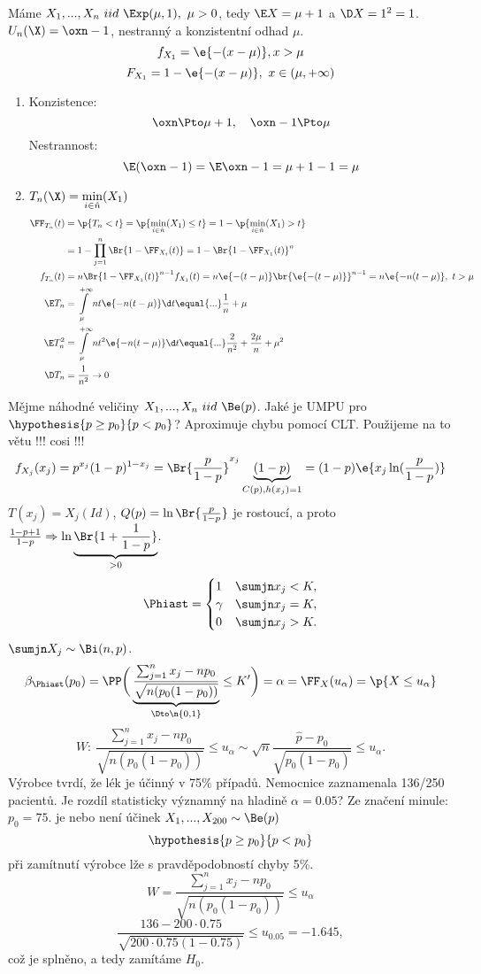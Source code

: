 \begin{example}
	Máme $X_1,...,X_n~iid~\Exp(\mu,1),~\mu>0$, tedy $\E X=\mu+1$ a $\D X=1^2=1$. $U_n(\X)=\oxn-1$, nestranný a konzistentní odhad $\mu$.
	$$ f_{X_1}=\e{-(x-\mu)},x>\mu $$
	$$ F_{X_1} = 1 - \e{-(x - \mu)},~ x \in (\mu,+\infty)$$
	\begin{enumerate}
	\item Konzistence: $$\oxn\Pto \mu+1,~~~\oxn-1\Pto\mu$$ 
	Nestrannost:
	$$\E(\oxn-1)=\E\oxn-1=\mu+1-1=\mu$$
	\item $ T_n(\X)=\min\limits_{i\in\hat{n}}(X_1) $
	\[
	\begin{split}
 	\FF_{T_n}(t)&=\p{T_n<t}=\p{\min\limits_{i\in\hat{n}}(X_1)\leq t}=1-\p{\min\limits_{i\in\hat{n}}(X_1)>t}\\ &=1-\prod\limits_{j=1}^n\Br{1-\FF_{X_i}(t)}=1-\Br{1-\FF_{X_1}(t)}^n\\
	f_{T_n}(t)&=n\Br{1-\FF_{X_1}(t)}^{n-1}f_{X_1}(t)=n\e{-(t-\mu)}\br{\e{-(t-\mu)}}^{n-1}=n\e{-n(t-\mu)},~t>\mu \\
	\E T_n&=\int\limits_{\mu}^{+\infty}nt\e{-n(t-\mu)}\d t\equal{...}\frac{1}{n}+\mu\\
	\E T_n^2&=\int\limits_{\mu}^{+\infty}nt^2\e{-n(t-\mu)}\d t\equal{...}\frac{2}{n^2}+\frac{2\mu}{n}+\mu^2\\
	\D T_n&=\frac{1}{n^2}\to 0
	\end{split}
	\]
\end{enumerate}
\end{example}

\begin{example}
	Mějme náhodné veličiny $X_1,...,X_n~iid~\Be(p)$. Jaké je UMPU pro $\hypothesis{p\geq p_0}{p<p_0}$? Aproximuje chybu pomocí CLT. Použijeme na to větu !!! cosi !!!
	$$ f_{X_j}(x_j)=p^{x_j}(1-p)^{1-x_j}=\Br{\frac{p}{1-p}}^{x_j}\underbrace{(1-p)}_{C(p),h(x_j)=1}=(1-p)\e{x_j\ln(\frac{p}{1-p})} $$
	$T(x_j)=X_j(Id)$, $Q(p)=\ln\Br{\frac{p}{1-p}}$ je rostoucí, a proto
	$ \frac{1-p+1}{1-p}\Rightarrow \ln\underbrace{\Br{1+\frac{1}{1-p}}}_{>0} $.
	$$ \Phiast=\begin{cases}
	1&\sumjn x_j<K,\\\gamma&\sumjn x_j=K,\\0&\sumjn x_j>K.
	\end{cases} $$
	$\sumjn X_j\sim\Bi(n,p)$.
	$$ \beta_{\Phiast}(p_0)=\PP\bigg(\underbrace{\frac{\sum_{j=1}^n x_j-np_0}{\sqrt{n(p_0(1-p_0))}}}_{\Dto\n{0,1}}\leq K'\bigg)=\alpha=\FF_X(u_\alpha)=\p{X\leq u_\alpha}$$
	$$ W:~\frac{\sum_{j=1}^n x_j-np_0}{\sqrt{n(p_0(1-p_0))}}\leq u_\alpha\sim \sqrt{n}\frac{\widehat{p}-p_0}{\sqrt{p_0(1-p_0)}}\leq u_\alpha. $$
	Výrobce tvrdí, že lék je účinný v 75\% případů. Nemocnice zaznamenala 136/250 pacientů. Je rozdíl statisticky významný na hladině $\alpha=0.05$?
	Ze značení minule: $p_0=75$. je nebo není účinek $X_1,...,X_{200}\sim\Be(p)$
	$$ \hypothesis{p\geq p_0}{p<p_0} $$ při zamítnutí výrobce lže s pravděpodobností chyby 5\%.
	$$ W=\frac{\sum_{j=1}^n x_j-np_0}{\sqrt{n(p_0(1-p_0))}}\leq u_\alpha $$
	$$ \frac{136-200\cdot 0.75}{\sqrt{200\cdot 0.75(1-0.75)}}\leq u_{0.05}=-1.645, $$ což je splněno, a tedy zamítáme $H_0$.
\end{example}	